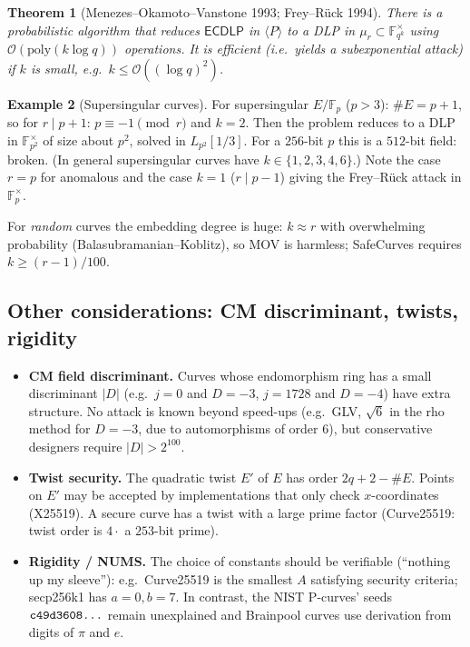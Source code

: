 \documentclass[11pt,a4paper,oneside]{book}
\theoremstyle{plain}
\newtheorem{theorem}{Theorem}[chapter]
\theoremstyle{definition}
\newtheorem{example}[theorem]{Example}
\theoremstyle{remark}
\newcommand{\F}{\mathbb{F}}
\newcommand{\Fp}{\mathbb{F}_p}
\newcommand{\bigO}{\mathcal{O}}
\newcommand{\ECDLP}{\mathsf{ECDLP}}
\begin{document}
\begin{theorem}[Menezes--Okamoto--Vanstone 1993; Frey--R\"uck 1994]\label{thm:MOV}
There is a probabilistic algorithm that reduces $\ECDLP$ in $\langle P\rangle$ to a DLP in $\mu_r\subset\F_{q^k}^\times$ using $\bigO(\mathrm{poly}(k\log q))$ operations. It is efficient (i.e.\ yields a subexponential attack) if $k$ is small, e.g.\ $k\le\bigO((\log q)^2)$.
\end{theorem}

\begin{example}[Supersingular curves]\label{ex:supersingular-embedding}
For supersingular $E/\Fp$ ($p>3$): $\#E=p+1$, so for $r\mid p+1$: $p\equiv-1\pmod r$ and $k=2$. Then the problem reduces to a DLP in $\F_{p^2}^\times$ of size about $p^2$, solved in $L_{p^2}[1/3]$. For a $256$-bit $p$ this is a $512$-bit field: broken. (In general supersingular curves have $k\in\{1,2,3,4,6\}$.) Note the case $r=p$ for anomalous and the case $k=1$ ($r\mid p-1$) giving the Frey--R\"uck attack in $\F_p^\times$.
\end{example}

For \emph{random} curves the embedding degree is huge: $k\approx r$ with overwhelming probability (Balasubramanian--Koblitz), so MOV is harmless; SafeCurves requires $k\ge(r-1)/100$.

\subsection{Other considerations: CM discriminant, twists, rigidity}

\begin{itemize}[nosep]
\item \textbf{CM field discriminant.} Curves whose endomorphism ring has a small discriminant $|D|$ (e.g.\ $j=0$ and $D=-3$, $j=1728$ and $D=-4$) have extra structure. No attack is known beyond speed-ups (e.g.\ GLV, $\sqrt{6}$ in the rho method for $D=-3$, due to automorphisms of order 6), but conservative designers require $|D|>2^{100}$.
\item \textbf{Twist security.} The quadratic twist $E'$ of $E$ has order $2q+2-\#E$. Points on $E'$ may be accepted by implementations that only check $x$-coordinates (X25519). A secure curve has a twist with a large prime factor (Curve25519: twist order is $4\cdot$ a $253$-bit prime).
\item \textbf{Rigidity / NUMS.} The choice of constants should be verifiable (``nothing up my sleeve''): e.g.\ Curve25519 is the smallest $A$ satisfying security criteria; secp256k1 has $a=0,b=7$. In contrast, the NIST P-curves' seeds $\texttt{c49d3608\dots}$ remain unexplained and Brainpool curves use derivation from digits of $\pi$ and $e$.
\end{itemize}
\end{document}
